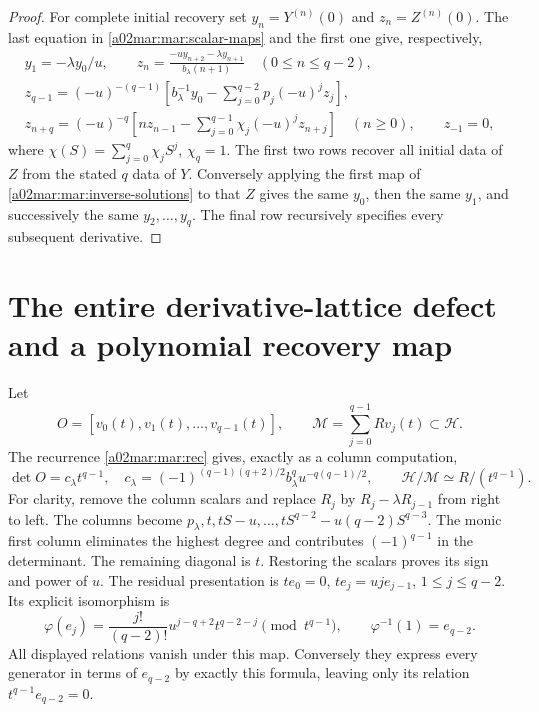 \begin{proof}
For complete initial recovery set $y_n=Y^{(n)}(0)$ and
$z_n=Z^{(n)}(0)$. The last equation in \eqref{a02mar:mar:scalar-maps}
and the first one give, respectively,
\begin{equation}\tag{MAR9}\label{a02mar:mar:initial}
 \begin{gathered}
 y_1=-\lambda y_0/u,\qquad
 z_n=\frac{-u y_{n+2}-\lambda y_{n+1}}{b_\lambda(n+1)}
             \quad(0\le n\le q-2),\\
 z_{q-1}=(-u)^{-(q-1)}
 \left[b_\lambda^{-1}y_0-
             \sum_{j=0}^{q-2}p_j(-u)^jz_j\right],\\
 z_{n+q}=(-u)^{-q}
 \left[nz_{n-1}-\sum_{j=0}^{q-1}\chi_j(-u)^jz_{n+j}\right]
          \quad(n\ge0),\qquad z_{-1}=0,
 \end{gathered}
\end{equation}
where $\chi(S)=\sum_{j=0}^q\chi_jS^j$, $\chi_q=1$.
The first two rows recover all initial data of $Z$ from the stated
$q$ data of $Y$. Conversely applying the first map of
\eqref{a02mar:mar:inverse-solutions} to that $Z$ gives the same $y_0$,
then the same $y_1$, and successively the same $y_2,\ldots,y_q$.
The final row recursively specifies every subsequent derivative.
\end{proof}

\section{The entire derivative-lattice defect and a polynomial recovery map}
Let
\[
 O=[v_0(t),v_1(t),\ldots,v_{q-1}(t)],\qquad
 \mathscr M=\sum_{j=0}^{q-1}Rv_j(t)\subset\mathscr H.
\]
The recurrence \eqref{a02mar:mar:rec} gives, exactly as a column computation,
\begin{equation}\tag{MAR10}\label{a02mar:mar:lattice}
 \det O=c_\lambda t^{q-1},\quad
 c_\lambda=(-1)^{(q-1)(q+2)/2}b_\lambda^q u^{-q(q-1)/2},
 \qquad\mathscr H/\mathscr M\simeq R/(t^{q-1}).
\end{equation}
For clarity, remove the column scalars and replace $R_j$ by
$R_j-\lambda R_{j-1}$ from right to left. The columns become
$p_\lambda,t,tS-u,\ldots,tS^{q-2}-u(q-2)S^{q-3}$.
The monic first column eliminates the highest degree and contributes
$(-1)^{q-1}$ in the determinant. The remaining diagonal is $t$.
Restoring the scalars proves its sign and power of $u$.
The residual presentation is
$te_0=0$, $te_j=uj e_{j-1}$, $1\le j\le q-2$.
Its explicit isomorphism is
\begin{equation}\tag{MAR11}\label{a02mar:mar:phi}
 \varphi(e_j)=\frac{j!}{(q-2)!}u^{j-q+2}t^{q-2-j}\pmod{t^{q-1}},
 \qquad\varphi^{-1}(1)=e_{q-2}.
\end{equation}
All displayed relations vanish under this map. Conversely they express
every generator in terms of $e_{q-2}$ by exactly this formula, leaving
only its relation $t^{q-1}e_{q-2}=0$.

